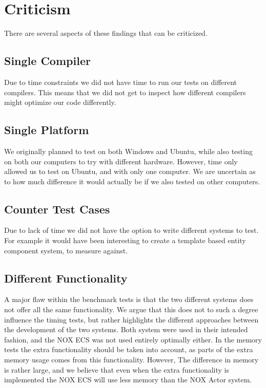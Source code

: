 \section{Criticism}
\label{sec:discussion_criticism}
There are several aspects of these findings that can be criticized.

\subsection{Single Compiler}
Due to time constraints we did not have time to run our tests on different compilers.
This means that we did not get to inspect how different compilers might optimize our code differently.

\subsection{Single Platform}
We originally planned to test on both Windows and Ubuntu, while also testing on both our computers to
try with different hardware. However, time only allowed us to test on Ubuntu, and with only one computer.
We are uncertain as to how much difference it would actually be if we also tested on other computers.

\subsection{Counter Test Cases}
Due to lack of time we did not have the option to write different systems to test.
For example it would have been interesting to create a template based entity component system,
to measure against.

\subsection{Different Functionality}
A major flaw within the benchmark tests is that the two different systems does not offer all the same functionality.
We argue that this does not to such a degree influence the timing tests, but rather highlights the different approaches
between the development of the two systems.
Both system were used in their intended fashion, and the NOX ECS was not used entirely optimally either.
In the memory tests the extra functionality should be taken into account, as parts of the extra memory usage
comes from this functionality.
However, The difference in memory is rather large, and we believe that even when the extra functionality is implemented
the NOX ECS will use less memory than the NOX Actor system.

